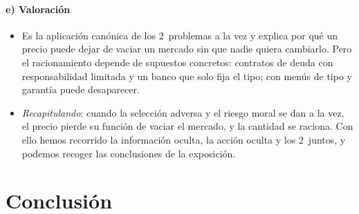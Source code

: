 \documentclass[11pt]{article}
\begin{document}
\paragraph{e) Valoración}

\begin{itemize}
\item Es la aplicación canónica de los 2~problemas a la vez y explica por qué un precio puede dejar de vaciar un mercado sin que nadie quiera cambiarlo. Pero el racionamiento depende de supuestos concretos: contratos de deuda con responsabilidad limitada y un banco que solo fija el tipo; con menús de tipo y garantía puede desaparecer.
\item \emph{Recapitulando}: cuando la selección adversa y el riesgo moral se dan a la vez, el precio pierde su función de vaciar el mercado, y la cantidad se raciona. Con ello hemos recorrido la información oculta, la acción oculta y los 2~juntos, y podemos recoger las conclusiones de la exposición.
\end{itemize}


\section*{Conclusión}
\end{document}

